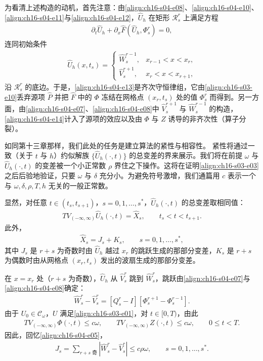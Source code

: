 ﻿\documentclass[../../main.tex]{subfiles}
\begin{document}
为看清上述构造的动机，首先注意：由\eqref{align:ch16-s04-e08}、\eqref{align:ch16-s04-e10}、\eqref{align:ch16-s04-e11}与\eqref{align:ch16-s04-e12}，$\hat U_h$ 在矩形 $\mathscr{R}_s^r$ 上满足方程
\begin{align}
\partial_t\hat U_h+\partial_x\hat F(\hat U_h,\Phi_s^r)=0,
\label{align:ch16-s04-e13}
\end{align}
连同初始条件
\begin{align}
\hat U_h(x,t_s)=
\begin{cases}
\hat W_s^{r-1},&x_{r-1}<x<x_r,\\
\hat V_s^{r+1},&x_r<x<x_{r+1},
\end{cases}
\label{align:ch16-s04-e14}
\end{align}
沿 $\mathscr{R}_s^r$ 的底边。于是，\eqref{align:ch16-s04-e13}是齐次守恒律组，它由\eqref{align:ch16-s03-e10}丢弃源项 $\hat P$ 并把 $\hat F$ 中的 $\Phi$ 冻结在网格点 $(x_r,t_s)$ 处的值 $\Phi_s^r$ 而得到。另一方面，由\eqref{align:ch16-s04-e07}、\eqref{align:ch16-s04-e08}中 $\hat V_s^{r+1}$ 与 $\hat W_s^{r-1}$ 的构造，\eqref{align:ch16-s04-e14}计入了源项的效应以及由 $\Phi$ 与 $Z$ 诱导的非齐次性（算子分裂）。

如同第十三章那样，我们此处的任务是建立算法的紧性与相容性。
紧性将通过一致（关于 $t$ 与 $h$）约似解族 $\{\hat U_h(\cdot,t)\}$ 的总变差的界来展示。我们将在前提 $\omega$ 与 $\hat U_h(\cdot,t)$ 的变差被一个小正常数 $\rho$ 界住之下操作。这将在证明\eqref{align:ch16-s03-e03}之后后验地验证，只要 $\omega$ 与 $\delta$ 充分小。为避免符号激增，我们通篇用 $c$ 表示一个与 $\omega,\delta,\rho,T,h$ 无关的一般正常数。

显然，对任意 $t\in(t_s,t_{s+1})$，$s=0,1,\ldots,s^*$，$\hat U_h(\cdot,t)$ 的总变差取相同值：
\begin{align}
TV_{(-\infty,\infty)}\hat U_h(\cdot,t)=\hat X_s,\qquad t_s<t<t_{s+1}.
\label{align:ch16-s04-e15}
\end{align}
此外，
\begin{align}
\hat X_s=J_s+K_s,\qquad s=0,1,\ldots,s^*,
\label{align:ch16-s04-e16}
\end{align}
其中 $J_s$ 是 $r+s$ 为奇数时由 $\hat U_h$ 越过 $x_r$ 的跳跃生成的那部分变差，$K_s$ 是 $r+s$ 为偶数时由从网格点 $(x_r,t_s)$ 发出的波扇生成的那部分变差。

在 $x=x_r$ 处（$r+s$ 为奇数），$\hat U_h$ 从 $\hat V_s^r$ 跳到 $\hat W_s^r$，跳跃由\eqref{align:ch16-s04-e07}与\eqref{align:ch16-s04-e08}确定：
\begin{align}
\hat W_s^r-\hat V_s^r=[Q_s^r-I][\Phi_s^{r+1}-\Phi_s^{r-1}].
\label{align:ch16-s04-e17}
\end{align}
由于 $U_0\in\mathscr{C}_\omega$，$U$ 满足\eqref{align:ch16-s03-e01}，对 $t\in[0,T)$，由此
\begin{align}
TV_{(-\infty,\infty)}\Phi(\cdot,t)\leqslant c\omega,\qquad TV_{(-\infty,\infty)}Z(\cdot,t)\leqslant c\omega,\qquad 0\leqslant t<T.
\label{align:ch16-s04-e18}
\end{align}
因此，回忆\eqref{align:ch16-s04-e05}，
\begin{align}
J_s=\sum_{r+s\text{ 奇}}|\hat W_s^r-\hat V_s^r|\leqslant c\rho\omega,\qquad s=0,1,\ldots,s^*.
\label{align:ch16-s04-e19}
\end{align}
\end{document}
